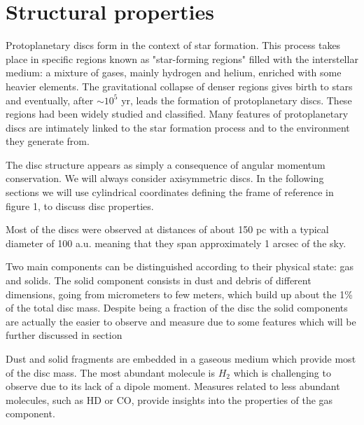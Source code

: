 \documentclass[a4paper,10pt]{report}
\begin{document}
\section{Structural properties}

\begin{comment}
Here I am going to discuss some key properties of protoplanetary discs and give
gross estimates of their typical values. I am going to discuss: 

— what discs are made of

— absolute and relative masses of gas and dust components

— dimension and distance

— their age

— temperature
\end{comment}

Protoplanetary discs form in the context of star formation. This process takes place in specific regions
known as "star-forming regions" filled with the interstellar medium: a mixture of gases, mainly hydrogen and helium, enriched with some
heavier elements. The gravitational collapse of denser regions gives birth to stars and eventually, after $\sim 10^5$ yr, leads the formation of protoplanetary discs.
These regions had been widely studied and classified. Many features of protoplanetary discs are intimately linked to the 
star formation process and to the environment they generate from.

The disc structure appears as simply a consequence of angular momentum conservation. We will always consider axisymmetric discs. 
In the following sections we will use cylindrical coordinates 
defining the frame of reference in figure 1, to discuss disc properties. 


Most of the discs were observed at distances of about 150 pc with a typical diameter of 100 a.u. meaning that they span approximately
1 arcsec of the sky. 

Two main components can be distinguished according to their physical state: gas and solids.
The solid component consists in dust and debris of different dimensions, going from micrometers to few 
meters, which build up about the 1\% of the total disc mass. Despite being a fraction of the disc the solid components
are actually the easier to observe and measure due to some features which will be further discussed in section {}

Dust and solid fragments are embedded in a gaseous medium which provide most of the disc mass. The most abundant molecule is $H_2$ which is challenging to observe due to
its lack of a dipole moment. Measures related to less abundant molecules, such as HD or CO, provide insights into the properties of the gas component. 
\end{document}
